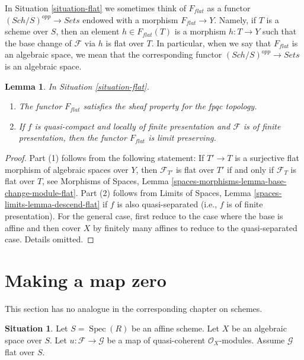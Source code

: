 \documentclass{stacks-project}
\theoremstyle{plain}
\newtheorem{lemma}[subsection]{Lemma}
\theoremstyle{definition}
\newtheorem{situation}[subsection]{Situation}
\theoremstyle{remark}
\numberwithin{equation}{subsection}
\def\Spec{\mathop{\mathrm{Spec}}}
\def\Sch{\mathit{Sch}}
\begin{document}
\noindent
In Situation \ref{situation-flat} we sometimes think of $F_{flat}$ as a functor
$(\Sch/S)^{opp} \to \textit{Sets}$ endowed with a morphism
$F_{flat} \to Y$. Namely, if $T$ is a scheme over $S$, then
an element $h \in F_{flat}(T)$ is a morphism $h : T \to Y$
such that the base change of $\mathcal{F}$ via $h$ is flat over $T$.
In particular, when we say
that $F_{flat}$ is an algebraic space, we mean that the corresponding
functor $(\Sch/S)^{opp} \to \textit{Sets}$ is an algebraic space.

\begin{lemma}
\label{lemma-flat}
In Situation \ref{situation-flat}.
\begin{enumerate}
\item The functor $F_{flat}$ satisfies the sheaf property for the fpqc topology.
\item If $f$ is quasi-compact and locally of finite presentation
and $\mathcal{F}$ is of finite presentation, then the functor
$F_{flat}$ is limit preserving.
\end{enumerate}
\end{lemma}

\begin{proof}
Part (1) follows from the following statement: If $T' \to T$ is a surjective
flat morphism of algebraic spaces over $Y$, then
$\mathcal{F}_{T'}$ is flat over $T'$ if and only if
$\mathcal{F}_T$ is flat over $T$, see
Morphisms of Spaces, Lemma \ref{spaces-morphisms-lemma-base-change-module-flat}.
Part (2) follows from
Limits of Spaces, Lemma \ref{spaces-limits-lemma-descend-flat}
if $f$ is also quasi-separated (i.e., $f$ is of finite presentation).
For the general case, first reduce to the case where the
base is affine and then cover $X$ by finitely many affines
to reduce to the quasi-separated case. Details omitted.
\end{proof}










\section{Making a map zero}
\label{section-zero-map}

\noindent
This section has no analogue in the corresponding chapter on schemes.

\begin{situation}
\label{situation-somewhat-closed}
Let $S = \Spec(R)$ be an affine scheme. Let $X$ be an algebraic space over
$S$. Let $u : \mathcal{F} \to \mathcal{G}$ be a map of quasi-coherent
$\mathcal{O}_X$-modules. Assume $\mathcal{G}$ flat over $S$.
\end{situation}
\end{document}
